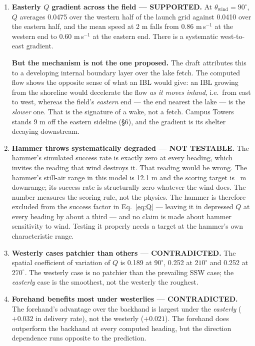 \documentclass[11pt,letterpaper]{article}
\begin{document}
\begin{enumerate}[leftmargin=*,itemsep=4pt]
  \item \textbf{Easterly $Q$ gradient across the field --- SUPPORTED.} At
    $\theta_{\text{wind}} = 90^\circ$, $Q$ averages 0.0475 over the western half
    of the launch grid against 0.0410 over the eastern half, and the mean speed
    at 2 m falls from 0.86 m\,s$^{-1}$ at the western end to 0.60 m\,s$^{-1}$ at
    the eastern end. There is a systematic west-to-east gradient.

    \textbf{But the mechanism is not the one proposed.} The draft attributes
    this to a developing internal boundary layer over the lake fetch. The
    computed flow shows the opposite sense of what an IBL would give: an IBL
    growing from the shoreline would decelerate the flow \emph{as it moves
    inland}, i.e.\ from east to west, whereas the field's \emph{eastern} end ---
    the end nearest the lake --- is the \emph{slower} one. That is the signature
    of a wake, not a fetch. Campus Towers stands 9 m off the eastern sideline
    (\S6), and the gradient is its shelter decaying downstream.

  \item \textbf{Hammer throws systematically degraded --- NOT TESTABLE.}
    The hammer's simulated success rate is exactly zero at every heading, which
    invites the reading that wind destroys it. That reading would be wrong. The
    hammer's still-air range in this model is 12.1 m and the scoring target is
    \TargetRange~m downrange; its success rate is structurally zero whatever the
    wind does. The number measures the scoring rule, not the physics. The hammer
    is therefore excluded from the success factor in Eq.~\ref{eq:Q} --- leaving
    it in depressed $Q$ at every heading by about a third --- and no claim is
    made about hammer sensitivity to wind. Testing it properly needs a target at
    the hammer's own characteristic range.

  \item \textbf{Westerly cases patchier than others --- CONTRADICTED.} The
    spatial coefficient of variation of $Q$ is 0.189 at $90^\circ$, 0.252 at
    $210^\circ$ and 0.252 at $270^\circ$. The westerly case is no patchier than
    the prevailing SSW case; the \emph{easterly} case is the smoothest, not the
    westerly the roughest.

  \item \textbf{Forehand benefits most under westerlies --- CONTRADICTED.} The
    forehand's advantage over the backhand is largest under the \emph{easterly}
    ($+0.032$ in delivery rate), not the westerly ($+0.021$). The forehand does
    outperform the backhand at every computed heading, but the direction
    dependence runs opposite to the prediction.


\end{enumerate}
\end{document}
